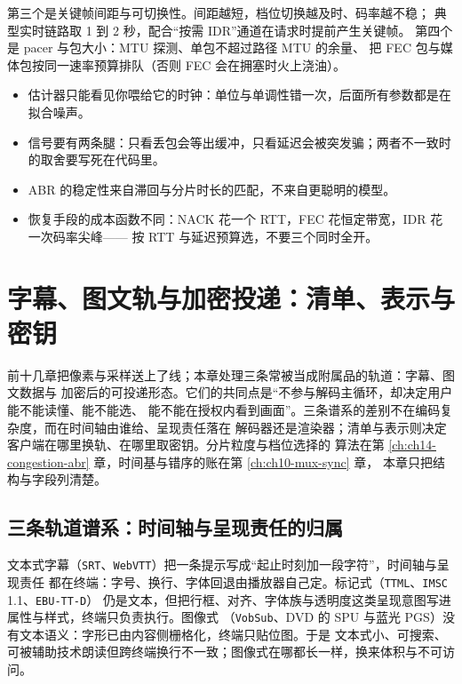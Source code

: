 \documentclass[12pt,a4paper,fontset=fandol]{ctexbook}
\newcommand{\Tp}[1]{\texttt{#1}}
\begin{document}
第三个是关键帧间距与可切换性。间距越短，档位切换越及时、码率越不稳；
典型实时链路取 1 到 2 秒，配合``按需 IDR''通道在请求时提前产生关键帧。
第四个是 pacer 与包大小：MTU 探测、单包不超过路径 MTU 的余量、
把 FEC 包与媒体包按同一速率预算排队（否则 FEC 会在拥塞时火上浇油）。

\begin{guideline}[title={传输质量的四个不变式}]
\begin{itemize}
\item 估计器只能看见你喂给它的时钟：单位与单调性错一次，后面所有参数都是在拟合噪声。
\item 信号要有两条腿：只看丢包会等出缓冲，只看延迟会被突发骗；两者不一致时的取舍要写死在代码里。
\item ABR 的稳定性来自滞回与分片时长的匹配，不来自更聪明的模型。
\item 恢复手段的成本函数不同：NACK 花一个 RTT，FEC 花恒定带宽，IDR 花一次码率尖峰——
      按 RTT 与延迟预算选，不要三个同时全开。
\end{itemize}
\end{guideline}

\chapter{字幕、图文轨与加密投递：清单、表示与密钥}
\label{ch:ch15-delivery}

前十几章把像素与采样送上了线；本章处理三条常被当成附属品的轨道：字幕、图文数据与
加密后的可投递形态。它们的共同点是``不参与解码主循环，却决定用户能不能读懂、能不能选、
能不能在授权内看到画面''。三条谱系的差别不在编码复杂度，而在时间轴由谁给、呈现责任落在
解码器还是渲染器；清单与表示则决定客户端在哪里换轨、在哪里取密钥。分片粒度与档位选择的
算法在第 \ref{ch:ch14-congestion-abr} 章，时间基与错序的账在第 \ref{ch:ch10-mux-sync} 章，
本章只把结构与字段列清楚。

\section{三条轨道谱系：时间轴与呈现责任的归属}
\label{sec:ch15-lineage}

文本式字幕（\Tp{SRT}、\Tp{WebVTT}）把一条提示写成``起止时刻加一段字符''，时间轴与呈现责任
都在终端：字号、换行、字体回退由播放器自己定。标记式（\Tp{TTML}、\Tp{IMSC} 1.1、\Tp{EBU-TT-D}）
仍是文本，但把行框、对齐、字体族与透明度这类呈现意图写进属性与样式，终端只负责执行。图像式
（\Tp{VobSub}、DVD 的 SPU 与蓝光 PGS）没有文本语义：字形已由内容侧栅格化，终端只贴位图。于是
文本式小、可搜索、可被辅助技术朗读但跨终端换行不一致；图像式在哪都长一样，换来体积与不可访问。
\end{document}
